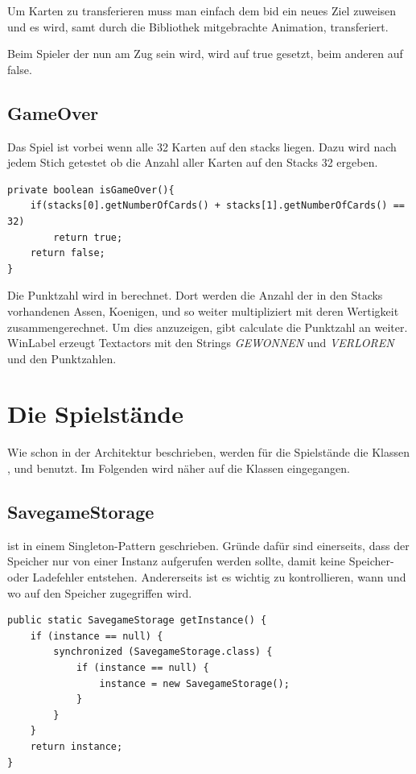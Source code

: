 Um Karten zu transferieren muss man einfach dem bid ein neues Ziel zuweisen und
es wird, samt durch die Bibliothek mitgebrachte Animation, transferiert.

Beim Spieler der nun am Zug sein wird, wird  auf true
gesetzt, beim anderen auf false.

\subsection{GameOver}

Das Spiel ist vorbei wenn alle 32 Karten auf den stacks liegen. Dazu wird nach
jedem Stich getestet ob die Anzahl aller Karten auf den Stacks 32 ergeben.

\begin{lstlisting}[caption={isGameOver() Methode},captionpos=b]
private boolean isGameOver(){
    if(stacks[0].getNumberOfCards() + stacks[1].getNumberOfCards() == 32)
        return true;
    return false;
}
\end{lstlisting}

Die Punktzahl wird in  berechnet. Dort werden die Anzahl
der in den Stacks vorhandenen Assen, Koenigen, und so weiter multipliziert mit
deren Wertigkeit zusammengerechnet. Um dies anzuzeigen, gibt calculate die
Punktzahl an  weiter. WinLabel erzeugt Textactors
mit den Strings \emph{GEWONNEN} und \emph{VERLOREN} und den Punktzahlen.

\section{Die Spielstände}
\sectionauthor{\leonard}

Wie schon in der Architektur beschrieben, werden für die Spielstände die Klassen
,  und  benutzt. Im
Folgenden wird näher auf die Klassen eingegangen.

\subsection{SavegameStorage}

ist in einem Singleton-Pattern geschrieben. Gründe dafür sind einerseits, dass
der Speicher nur von einer Instanz aufgerufen werden sollte, damit keine
Speicher- oder Ladefehler entstehen. Andererseits ist es wichtig zu
kontrollieren, wann und wo auf den Speicher zugegriffen wird.

\begin{lstlisting}[caption={SavegameStorage Singleton},captionpos=b]
public static SavegameStorage getInstance() {
	if (instance == null) {
		synchronized (SavegameStorage.class) {
			if (instance == null) {
				instance = new SavegameStorage();
			}
		}
	}
	return instance;
}
\end{lstlisting}

